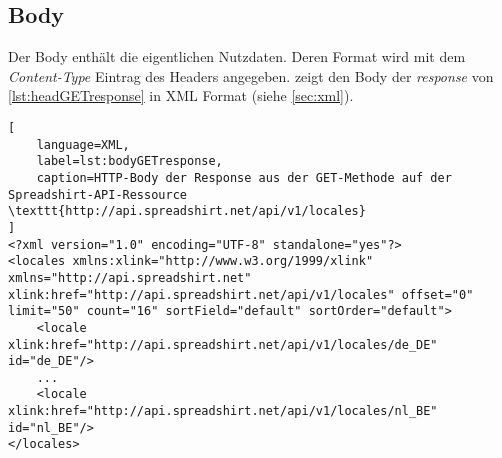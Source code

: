 \subsection{Body}
\label{sec:http-body}

Der Body enthält die eigentlichen Nutzdaten. Deren Format wird mit dem \emph{Content-Type} Eintrag des Headers angegeben.  zeigt den Body der \emph{response} von \cref{lst:headGETresponse} in \gls{XML} Format (siehe \cref{sec:xml}).

\begin{lstlisting}[
    language=XML,
    label=lst:bodyGETresponse,
    caption=HTTP-Body der Response aus der GET-Methode auf der Spreadshirt-API-Ressource \texttt{http://api.spreadshirt.net/api/v1/locales}
]
<?xml version="1.0" encoding="UTF-8" standalone="yes"?>
<locales xmlns:xlink="http://www.w3.org/1999/xlink" xmlns="http://api.spreadshirt.net" xlink:href="http://api.spreadshirt.net/api/v1/locales" offset="0" limit="50" count="16" sortField="default" sortOrder="default">
    <locale xlink:href="http://api.spreadshirt.net/api/v1/locales/de_DE" id="de_DE"/>
    ...
    <locale xlink:href="http://api.spreadshirt.net/api/v1/locales/nl_BE" id="nl_BE"/>
</locales>
\end{lstlisting}
